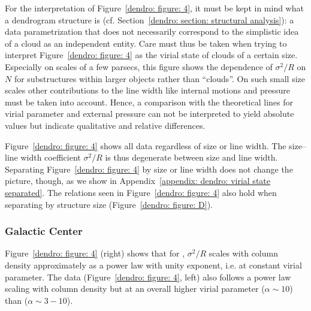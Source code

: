 For the interpretation of Figure~\ref{dendro: figure: 4}, it must be kept in mind what a dendrogram structure is (cf. Section~\ref{dendro: section: structural analysis}): a data parametrization that does not necessarily correspond to the simplistic idea of a cloud as an independent entity.
Care must thus be taken when trying to interpret Figure~\ref{dendro: figure: 4} as the virial state of clouds of a certain size.
Especially on scales of a few parsecs, this figure shows the dependence of $\sigma^2/R$ on $N$ for substructures within larger objects rather than ``clouds''. On such small size scales other contributions to the line width like internal motions and pressure must be taken into account. Hence, a comparison with the theoretical lines for virial parameter and external pressure can not be interpreted to yield absolute values but indicate qualitative and relative differences.

Figure~\ref{dendro: figure: 4} shows all data regardless of size or line width. The size--line width coefficient $\sigma^2/R$ is thus degenerate between size and line width. Separating Figure~\ref{dendro: figure: 4} by size or line width does not change the picture, though, as we show in Appendix~\ref{appendix: dendro: virial state separated}. The relations seen in Figure~\ref{dendro: figure: 4} also hold when separating by structure size (Figure~\ref{dendro: figure: D}).



\subsubsection{Galactic Center}
\label{dendro: section: size virial state: GC}

Figure~\ref{dendro: figure: 4} (right) shows that for , $\sigma^2/R$ scales with column density approximately as a power law with unity exponent, i.e. at constant virial parameter.
The  data (Figure~\ref{dendro: figure: 4}, left) also follows a power law scaling with column density but at an overall higher virial parameter ($\alpha \sim 10$) than  ($\alpha \sim3-10$).


\subsubsection{}
\label{dendro: section: size virial state: ngc253}

